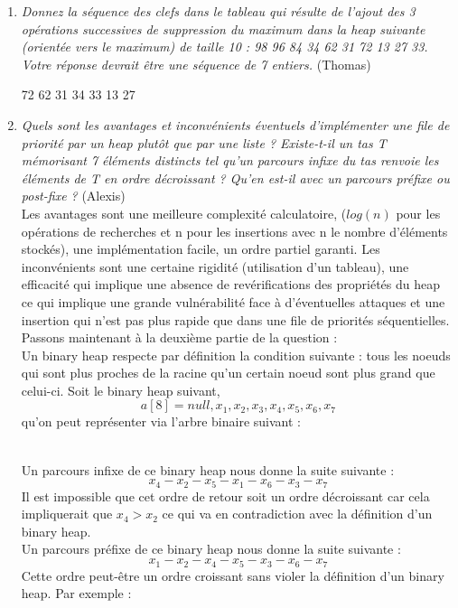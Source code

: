 \documentclass[11pt]{article}
\begin{document}
\begin{enumerate}
\item \textit{Donnez la séquence des clefs dans le tableau qui résulte de l'ajout des 3 opérations successives de suppression du maximum dans la heap suivante (orientée vers le maximum) de taille 10 : 98 96 84 34 62 31 72 13 27 33. Votre réponse devrait être une séquence de 7 entiers.} (Thomas)\\
\centerline{72  62  31  34  33  13  27}

\item \textit{Quels sont les avantages et inconvénients éventuels d’implémenter une file de priorité par un heap plutôt que par une liste ? Existe-t-il un tas T mémorisant 7 éléments distincts tel qu’un parcours infixe du tas renvoie les éléments de T en ordre décroissant ? Qu’en est-il avec un parcours préfixe ou post-fixe ?} (Alexis)\\
Les avantages sont une meilleure complexité calculatoire, 
($log(n)$ pour les opérations de recherches et n pour les insertions avec n le nombre d'éléments stockés),
une implémentation facile, un ordre partiel garanti. Les inconvénients sont une certaine
rigidité (utilisation d'un tableau), une efficacité qui implique une absence de
revérifications des propriétés du heap ce qui implique une grande vulnérabilité face à
d'éventuelles attaques et une insertion qui n'est pas plus rapide que dans une file de
priorités séquentielles.\\
Passons maintenant à la deuxième partie de la question : \\
Un binary heap respecte par définition la condition suivante : tous les noeuds qui sont plus proches de la racine qu'un certain noeud sont plus grand que celui-ci.
Soit le binary heap suivant,
$$ a[8] = {null, x_1, x_2, x_3, x_4, x_5, x_6, x_7} $$
qu'on peut représenter via l'arbre binaire suivant :\\
\\
Un parcours infixe de ce binary heap nous donne la suite suivante :
$$ x_4 - x_2 - x_5 - x_1 - x_6 - x_3 - x_7 $$
Il est impossible que cet ordre de retour soit un ordre décroissant car cela impliquerait que $ x_4  > x_2 $ ce qui va en contradiction avec la définition d'un binary heap. \\
Un parcours préfixe de ce binary heap nous donne la suite suivante :
$$ x_1 - x_2 - x_4 - x_5 - x_3 - x_6 - x_7 $$
Cette ordre peut-être un ordre croissant sans violer la définition d'un binary heap. Par exemple : \\
\\


\end{enumerate}
\end{document}
